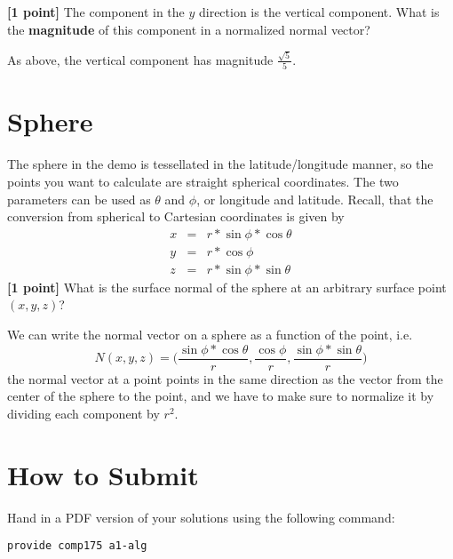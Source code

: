 \documentclass[10pt,twocolumn]{article}
\begin{document}
{\bf [1 point]} The component in the $y$ direction is the vertical component. What is the {\bf magnitude} of this component in a normalized normal vector?
\begin{framed}
As above, the vertical component has magnitude $\frac{\sqrt{5}}{5}$.
\end{framed}


\section{Sphere}
The sphere in the demo is tessellated in the latitude/longitude manner, so the points you want to calculate are straight spherical coordinates. The two parameters can be used as $\theta$ and $\phi$, or longitude and latitude. Recall, that the conversion from spherical to Cartesian coordinates is given by
\begin{eqnarray*}
x & = & r * \sin{\phi} * \cos{\theta}\\
y & = & r * \cos{\phi}\\
z & = & r * \sin{\phi}*\sin{\theta}
\end{eqnarray*}
{\bf [1 point]} What is the surface normal of the sphere at an arbitrary surface point $(x,y,z)$?
\begin{framed}
We can write the normal vector on a sphere as a function of the point, i.e.
\[N(x, y, z) = \Big(\frac{\sin{\phi} * \cos{\theta}}{r}, \frac{\cos{\phi}}{r}, \frac{\sin{\phi}*\sin{\theta}}{r}\Big)\]
the normal vector at a point points in the same direction as the vector from the center
of the sphere to the point, and we have to make sure to normalize it by dividing each component by $r^2$.
\end{framed}


\section{How to Submit}

Hand in a PDF version of your solutions using the following command:
\begin{center}
 {\tt provide comp175 a1-alg}
 \end{center}
\end{document}
